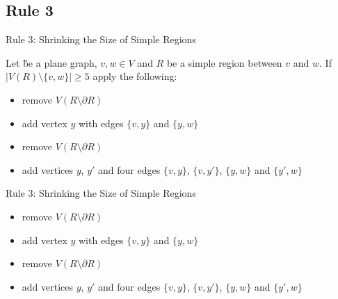 \subsection{Rule 3}
\begin{frame}[c]{Rule 3: Shrinking the Size of Simple Regions}

    Let \G be a plane graph, $v, w \in V$ and $R$ be a simple region between $v$ and $w$. If $|V(R) \setminus \{v, w\}| \geq 5$ apply the following:

    \begin{caseof}

            \begin{itemize}
                    \item remove $V(R\setminus\partial R)$
                    \item add vertex $y$ with edges $\{v, y\}$ and $\{y, w\}$
            \end{itemize}


            \begin{itemize}
                    \item remove $V(R\setminus\partial R)$
                    \item add vertices $y$, $y'$ and four edges $\{v,y\}$, $\{v, y'\}$, $\{y, w\}$ and $\{y', w\}$
            \end{itemize}
        \end{caseof}
\end{frame}

\begin{frame}[c]{Rule 3: Shrinking the Size of Simple Regions}

    \begin{caseof}
        {\bfseries

            \begin{itemize}
                    \item remove $V(R\setminus\partial R)$
                    \item add vertex $y$ with edges $\{v, y\}$ and $\{y, w\}$
            \end{itemize}
        }


            \begin{itemize}
                    \item remove $V(R\setminus\partial R)$
                    \item add vertices $y$, $y'$ and four edges $\{v,y\}$, $\{v, y'\}$, $\{y, w\}$ and $\{y', w\}$
            \end{itemize}
        \end{caseof}

    \begin{figure}[!ht]
    \end{figure}
\end{frame}

